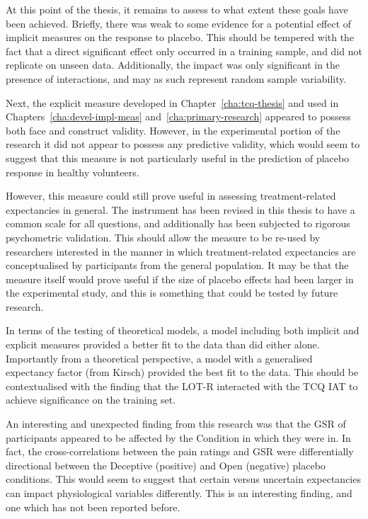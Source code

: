 At this point of the thesis, it remains to assess to what extent these
goals have been achieved. Briefly, there was weak to some evidence for
a potential effect of implicit measures on the response to placebo.
This should be tempered with the fact that a direct significant effect
only occurred in a training sample, and did not replicate on unseen
data. Additionally, the impact was only significant in the presence of
interactions, and may as such represent random sample variability.

Next, the explicit measure developed in Chapter~\ref{cha:tcq-thesis}
and used in Chapters~\ref{cha:devel-impl-meas}
and~\ref{cha:primary-research} appeared to possess both face and
construct validity. However, in the experimental portion of the
research it did not appear to possess any predictive validity, which
would seem to suggest that this measure is not particularly useful in
the prediction of placebo response in healthy volunteers.


However, this measure could still prove useful in assessing
treatment-related expectancies in general. The instrument has been
revised in this thesis to have a common scale for all questions, and
additionally has been subjected to rigorous psychometric validation.
This should allow the measure to be re-used by researchers interested
in the manner in which treatment-related expectancies are
conceptualised by participants from the general population. It may be
that the measure itself would prove useful if the size of placebo
effects had been larger in the experimental study, and this is
something that could be tested by future research.

In terms of the testing of theoretical models, a model including both
implicit and explicit measures provided a better fit to the data than
did either alone. Importantly from a theoretical perspective, a model
with a generalised expectancy factor (from Kirsch) provided the best
fit to the data. This should be contextualised with the finding that
the LOT-R interacted with the TCQ IAT to achieve significance on the
training set.

An interesting and unexpected finding from this research was that the
GSR of participants appeared to be affected by the Condition in which
they were in. In fact, the cross-correlations between the pain ratings
and GSR were differentially directional between the Deceptive
(positive) and Open (negative) placebo conditions. This would seem to
suggest that certain versus uncertain expectancies can impact
physiological variables differently. This is an interesting finding,
and one which has not been reported before.

